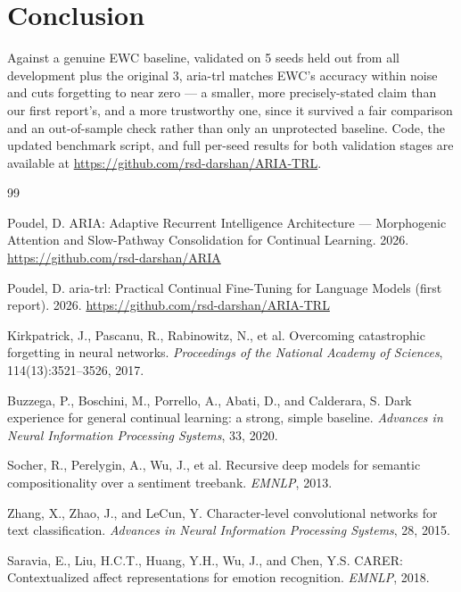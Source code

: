 \documentclass[10pt,twocolumn]{article}
\begin{document}
\section{Conclusion}

Against a genuine EWC baseline, validated on 5 seeds held out from all
development plus the original 3, aria-trl matches EWC's accuracy within
noise and cuts forgetting to near zero — a smaller, more precisely-stated
claim than our first report's, and a more trustworthy one, since it survived
a fair comparison and an out-of-sample check rather than only an unprotected
baseline. Code, the updated benchmark script, and full per-seed results for
both validation stages are available at
\url{https://github.com/rsd-darshan/ARIA-TRL}.


\begin{thebibliography}{99}

Poudel, D.
ARIA: Adaptive Recurrent Intelligence Architecture --- Morphogenic Attention
and Slow-Pathway Consolidation for Continual Learning.
2026.
\url{https://github.com/rsd-darshan/ARIA}

Poudel, D.
aria-trl: Practical Continual Fine-Tuning for Language Models (first report).
2026.
\url{https://github.com/rsd-darshan/ARIA-TRL}

Kirkpatrick, J., Pascanu, R., Rabinowitz, N., et al.
Overcoming catastrophic forgetting in neural networks.
\emph{Proceedings of the National Academy of Sciences}, 114(13):3521--3526, 2017.

Buzzega, P., Boschini, M., Porrello, A., Abati, D., and Calderara, S.
Dark experience for general continual learning: a strong, simple baseline.
\emph{Advances in Neural Information Processing Systems}, 33, 2020.

Socher, R., Perelygin, A., Wu, J., et al.
Recursive deep models for semantic compositionality over a sentiment
treebank.
\emph{EMNLP}, 2013.

Zhang, X., Zhao, J., and LeCun, Y.
Character-level convolutional networks for text classification.
\emph{Advances in Neural Information Processing Systems}, 28, 2015.

Saravia, E., Liu, H.C.T., Huang, Y.H., Wu, J., and Chen, Y.S.
CARER: Contextualized affect representations for emotion recognition.
\emph{EMNLP}, 2018.

\end{thebibliography}
\end{document}

